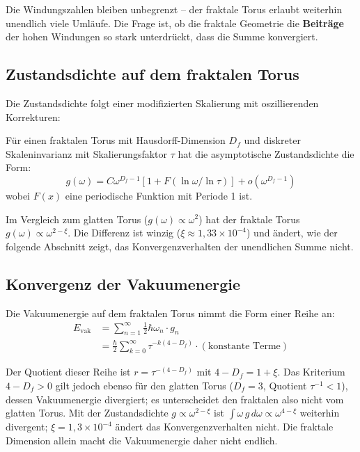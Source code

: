 	Die Windungszahlen bleiben unbegrenzt -- der fraktale Torus erlaubt weiterhin unendlich viele Umläufe. Die Frage ist, ob die fraktale Geometrie die \textbf{Beiträge} der hohen Windungen so stark unterdrückt, dass die Summe konvergiert.
	
	\subsection{Zustandsdichte auf dem fraktalen Torus}
	
	Die Zustandsdichte folgt einer modifizierten Skalierung mit oszillierenden Korrekturen:
	
	\begin{keypoint}
		Für einen fraktalen Torus mit Hausdorff-Dimension $D_f$ und diskreter Skaleninvarianz mit Skalierungsfaktor $\tau$ hat die asymptotische Zustandsdichte die Form:
		\begin{equation}
			g(\omega) = C \omega^{D_f-1} \left[ 1 + F(\ln \omega / \ln \tau) \right] + o(\omega^{D_f-1})
			\label{eq:dos-fractal}
		\end{equation}
		wobei $F(x)$ eine periodische Funktion mit Periode 1 ist.
	\end{keypoint}
	
	Im Vergleich zum glatten Torus ($g(\omega) \propto \omega^2$) hat der fraktale Torus $g(\omega) \propto \omega^{2-\xi}$. Die Differenz ist winzig ($\xi \approx 1{,}33 \times 10^{-4}$) und ändert, wie der folgende Abschnitt zeigt, das Konvergenzverhalten der unendlichen Summe nicht.
	
	\subsection{Konvergenz der Vakuumenergie}
	
	Die Vakuumenergie auf dem fraktalen Torus nimmt die Form einer Reihe an:
	\begin{align}
		E_{\text{vak}} &= \sum_{n=1}^{\infty} \frac{1}{2} \hbar \omega_n \cdot g_n \\
		&= \frac{\hbar}{2} \sum_{k=0}^{\infty} \tau^{-k(4-D_f)} \cdot (\text{konstante Terme})
	\end{align}
	
	Der Quotient dieser Reihe ist $r = \tau^{-(4-D_f)}$ mit $4 - D_f = 1 + \xi$. Das Kriterium $4 - D_f > 0$ gilt jedoch ebenso für den glatten Torus ($D_f = 3$, Quotient $\tau^{-1} < 1$), dessen Vakuumenergie divergiert; es unterscheidet den fraktalen also nicht vom glatten Torus. Mit der Zustandsdichte $g \propto \omega^{2-\xi}$ ist $\int \omega\, g\, d\omega \propto \omega^{4-\xi}$ weiterhin divergent; $\xi = 1{,}3\times10^{-4}$ ändert das Konvergenzverhalten nicht. Die fraktale Dimension allein macht die Vakuumenergie daher nicht endlich.
	

